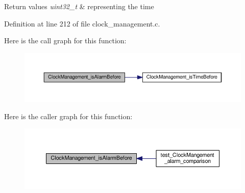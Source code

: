 \begin{DoxyRetVals}{Return values}
{\em uint32\+\_\+t} & representing the time \\
\hline
\end{DoxyRetVals}


Definition at line 212 of file clock\+\_\+management.\+c.



Here is the call graph for this function\+:\nopagebreak
\begin{figure}[H]
\begin{center}
\leavevmode
\includegraphics[width=350pt]{d7/dce/group___clock___management___alarm_comp_gaba2475baa28dfdc82e7a51a19fa8a7b9_cgraph}
\end{center}
\end{figure}




Here is the caller graph for this function\+:\nopagebreak
\begin{figure}[H]
\begin{center}
\leavevmode
\includegraphics[width=350pt]{d7/dce/group___clock___management___alarm_comp_gaba2475baa28dfdc82e7a51a19fa8a7b9_icgraph}
\end{center}
\end{figure}


